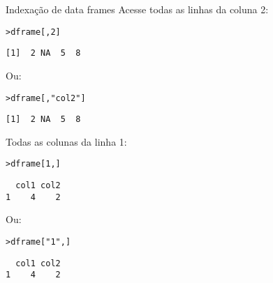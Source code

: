 \documentclass[10pt,handout]{beamer}\usepackage{graphicx, color}
\makeatletter
\newcommand{\hlstring}[1]{\textcolor[rgb]{0.282352941176471,0.23921568627451,0.545098039215686}{#1}}%
\newenvironment{kframe}{%
 \def\at@end@of@kframe{}%
 \ifinner\ifhmode%
  \def\at@end@of@kframe{\end{minipage}}%
  \begin{minipage}{\columnwidth}%
 \fi\fi%
 \def\FrameCommand##1{\hskip\@totalleftmargin \hskip-\fboxsep
 \colorbox{shadecolor}{##1}\hskip-\fboxsep
     \hskip-\linewidth \hskip-\@totalleftmargin \hskip\columnwidth}%
 \MakeFramed {\advance\hsize-\width
   \@totalleftmargin\z@ \linewidth\hsize
   \@setminipage}}%
 {\par\unskip\endMakeFramed%
 \at@end@of@kframe}
\newenvironment{knitrout}{}{} %
\makeatother
\begin{document}
\begin{frame}[fragile=singleslide]{Indexação de data frames}
Acesse todas as linhas da coluna 2:
\begin{knitrout}\small
{}\color{fgcolor}\begin{kframe}
\begin{alltt}
> dframe[,2]
\end{alltt}
\begin{verbatim}
[1]  2 NA  5  8
\end{verbatim}
\end{kframe}
\end{knitrout}

Ou:
\begin{knitrout}\small
{}\color{fgcolor}\begin{kframe}
\begin{alltt}
> dframe[,\hlstring{"col2"}]
\end{alltt}
\begin{verbatim}
[1]  2 NA  5  8
\end{verbatim}
\end{kframe}
\end{knitrout}

Todas as colunas da linha 1:
\begin{knitrout}\small
{}\color{fgcolor}\begin{kframe}
\begin{alltt}
> dframe[1,]
\end{alltt}
\begin{verbatim}
  col1 col2
1    4    2
\end{verbatim}
\end{kframe}
\end{knitrout}

Ou:
\begin{knitrout}\small
{}\color{fgcolor}\begin{kframe}
\begin{alltt}
> dframe[\hlstring{"1"},]
\end{alltt}
\begin{verbatim}
  col1 col2
1    4    2
\end{verbatim}
\end{kframe}
\end{knitrout}

\end{frame}
\end{document}
